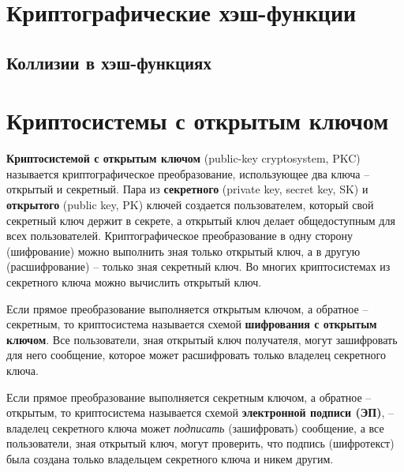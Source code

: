 \documentclass[10pt,a4paper]{book}
\begin{document}
\chapter{Криптографические хэш-функции}







\section{Коллизии в хэш-функциях}







\chapter{Криптосистемы с открытым ключом}

\textbf{Криптосистемой с открытым ключом} (public-key cryptosystem, PKC) называется криптографическое преобразование, использующее два ключа -- открытый и секретный. Пара из \textbf{секретного} (private key, secret key, SK) и \textbf{открытого} (public key, PK) ключей создается пользователем, который свой секретный ключ держит в секрете, а открытый ключ делает общедоступным для всех пользователей. Криптографическое преобразование в одну сторону (шифрование) можно выполнить зная только открытый ключ, а в другую (расшифрование) -- только зная секретный ключ. Во многих криптосистемах из секретного ключа можно вычислить открытый ключ.

Если прямое преобразование выполняется открытым ключом, а обратное -- секретным, то криптосистема называется схемой \textbf{шифрования с открытым ключом}. Все пользователи, зная открытый ключ получателя, могут зашифровать для него сообщение, которое может расшифровать только владелец секретного ключа.

Если прямое преобразование выполняется секретным ключом, а обратное -- открытым, то криптосистема называется схемой \textbf{электронной подписи (ЭП)}, -- владелец секретного ключа может \emph{подписать} (зашифровать) сообщение, а все пользователи, зная открытый ключ, могут проверить, что подпись (шифротекст) была создана только владельцем секретного ключа и никем другим.
\end{document}
